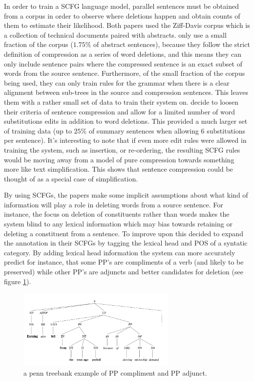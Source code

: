 {In order to train a SCFG language model, parallel sentences must be obtained from a corpus in order to observe where deletions happen and  obtain counts of them to estimate their likelihood.  Both papers used the Ziff-Davis corpus which is a collection of technical documents paired with abstracts. \citet{knight2000statistics} only use a small fraction of the corpus ($1.75 \%$ of abstract sentences), because they follow the strict definition of compression as a series of word deletions, and this means they can only include sentence pairs where the compressed sentence is an exact subset of words from the source sentence.  Furthermore, of the small fraction of the corpus being used, they can only train rules for the grammar when there is a clear alignment between sub-trees in the source and compression sentences.  This leaves them with a rather small set of data to train their system on.  \citet{galley2007lexicalized} decide to loosen their criteria of sentence compression and allow for a limited number of word substitutions edits in addition to word deletions.  This provided a much larger set of training data (up to $25 \%$ of summary sentences when allowing 6 substitutions per sentence).   It's interesting to note that if even more edit rules were allowed in training the system, such as insertion, or re-ordering, the resulting SCFG rules would be moving away from a model of pure compression towards something more like text simplification.  This shows that sentence compression could be thought of as a special case of simplification.}


{By using SCFGs, the papers make some implicit assumptions about what kind of information will play a role in deleting words from a source sentence.  For instance, the focus on deletion of constituents rather than words makes the system blind to any lexical information which may bias towards retaining or deleting a constituent from a sentence. To improve upon this \citet{galley2007lexicalized} decided to expand the annotation in their SCFGs by tagging the lexical head and POS of a syntatic category.  By adding lexical head information the system can more accurately predict for instance, that some PP's are compliments of a verb (and likely to be preserved) while other PP's are adjuncts and better candidates for deletion (see figure \ref{fig:tree}).}

\begin{figure}[H]
\centering
\includegraphics[width=0.7\textwidth]{tree1.png}
\caption{a penn treebank example of PP compliment and PP adjunct.}
\label{fig:tree}
\end{figure}

